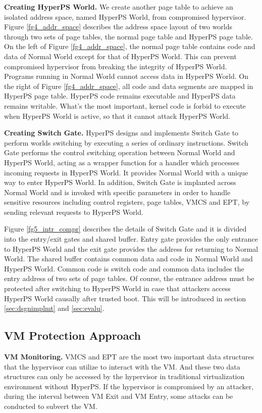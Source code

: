 \documentclass[10pt, numbers, preprint ]{sigplanconf}
\begin{document}
{\textbf{Creating HyperPS World.} We create another page table to achieve an isolated address space, named HyperPS World, from compromised hypervisor. Figure \ref{fg4_addr_space} describes the address space layout of two worlds through two sets of page tables, the normal page table and HyperPS page table. On the left of Figure \ref{fg4_addr_space}, the normal page table contains code and data of Normal World except for that of HyperPS World. This can prevent compromised hypervisor from breaking the integrity of HyperPS World. Programs running in Normal World cannot access data in HyperPS World. On the right of Figure \ref{fg4_addr_space}, all code and data segments are mapped in HyperPS page table. HyperPS code remains executable and HyperPS data remains writable. What’s the most important, kernel code is forbid to execute when HyperPS World is active, so that it cannot attack HyperPS World.

\textbf{Creating Switch Gate.} HyperPS designs and implements Switch Gate to perform worlds switching by executing a series of ordinary instructions. Switch Gate performs the control switching operation between Normal World and HyperPS World, acting as a wrapper function for a handler which processes incoming requests in HyperPS World. It provides Normal World with a unique way to enter HyperPS World. In addition, Switch Gate is implanted across Normal World and is invoked with specific parameters in order to handle sensitive resources including control registers, page tables, VMCS and EPT, by sending relevant requests to HyperPS World.

Figure \ref{fg5_intr_compr} describes the details of Switch Gate and it is divided into the entry/exit gates and shared buffer. Entry gate provides the only entrance to HyperPS World and the exit gate provides the address for returning to Normal World. The shared buffer contains common data and code in Normal World and HyperPS World. Common code is switch code and common data includes the entry address of two sets of page tables. Of course, the entrance address must be protected after switching to HyperPS World in case that attackers access HyperPS World causally after trusted boot. This will be introduced in section \ref{sec:dsgnimplmt} and \ref{sec:evalu}.

\subsection{VM Protection Approach} \label{subsec:vmprotapp}
\textbf{VM Monitoring.} VMCS and EPT are the most two important data structures that the hypervisor can utilize to interact with the VM. And these two data structures can only be accessed by the hypervisor in traditional virtualization environment without HyperPS. If the hypervisor is compromised by an attacker, during the interval between VM Exit and VM Entry, some attacks can be conducted to subvert the VM.

}
\end{document}
